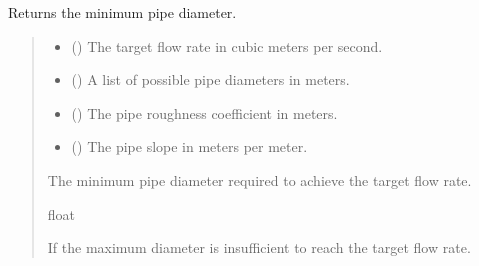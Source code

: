 \documentclass[letterpaper,10pt,english]{sphinxmanual}
\begin{document}
\begin{fulllineitems}
\label{\detokenize{pysewer:pysewer.optimization.select_diameter}}
\pysigstartsignatures
{}
\pysigstopsignatures
\sphinxAtStartPar
Returns the minimum pipe diameter.
\begin{quote}\begin{description}
\begin{itemize}
\item {} 
\sphinxAtStartPar
{} () \textendash{} The target flow rate in cubic meters per second.

\item {} 
\sphinxAtStartPar
{} () \textendash{} A list of possible pipe diameters in meters.

\item {} 
\sphinxAtStartPar
{} () \textendash{} The pipe roughness coefficient in meters.

\item {} 
\sphinxAtStartPar
{} () \textendash{} The pipe slope in meters per meter.

\end{itemize}

\sphinxAtStartPar
The minimum pipe diameter required to achieve the target flow rate.

\sphinxAtStartPar
float

\sphinxAtStartPar
{} \textendash{} If the maximum diameter is insufficient to reach the target flow rate.

\end{description}\end{quote}

\end{fulllineitems}
\end{document}
